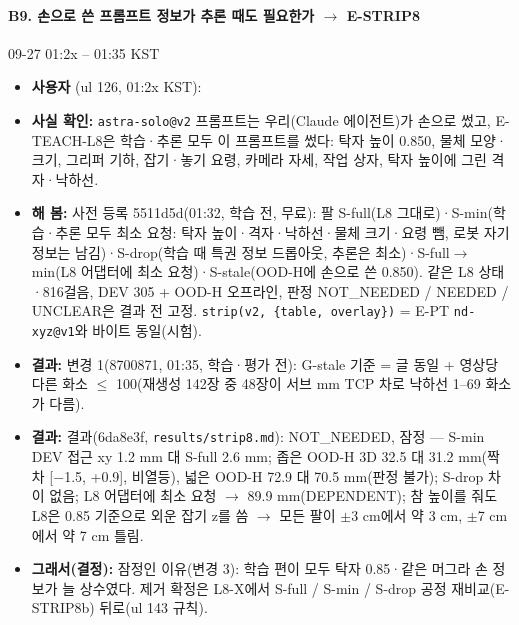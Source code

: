 \paragraph{B9. 손으로 쓴 프롬프트 정보가 추론 때도 필요한가 $\rightarrow$ E-STRIP8}
{\small 09-27 01:2x -- 01:35 KST}
\begin{itemize}
  \item \textbf{사용자} (ul 126, 01:2x KST): 
  \item \textbf{사실 확인:} \texttt{astra-\allowbreak{}solo@v2} 프롬프트는 우리(Claude 에이전트)가 손으로 썼고, E-TEACH-L8은 학습·추론 모두 이 프롬프트를 썼다: 탁자 높이 0.850, 물체 모양·크기, 그리퍼 기하, 잡기·놓기 요령, 카메라 자세, 작업 상자, 탁자 높이에 그린 격자·낙하선.
  \item \textbf{해 봄:} 사전 등록 5511d5d(01:32, 학습 전, 무료): 팔 S-full(L8 그대로)·S-min(학습·추론 모두 최소 요청: 탁자 높이·격자·낙하선·물체 크기·요령 뺌, 로봇 자기 정보는 남김)·S-drop(학습 때 특권 정보 드롭아웃, 추론은 최소)·S-full$\rightarrow$min(L8 어댑터에 최소 요청)·S-stale(OOD-H에 손으로 쓴 0.850). 같은 L8 상태·816걸음, DEV 305 + OOD-H 오프라인, 판정 NOT\_NEEDED / NEEDED / UNCLEAR은 결과 전 고정. \texttt{strip(v2, \{table, overlay\})} = E-PT \texttt{nd-\allowbreak{}xyz@v1}와 바이트 동일(시험).
  \item \textbf{결과:} 변경 1(8700871, 01:35, 학습·평가 전): G-stale 기준 = 글 동일 + 영상당 다른 화소 $\leq$ 100(재생성 142장 중 48장이 서브 mm TCP 차로 낙하선 1--69 화소가 다름).
  \item \textbf{결과:} 결과(6da8e3f, \texttt{results/\allowbreak{}strip8.\allowbreak{}md}): NOT\_NEEDED, 잠정 --- S-min DEV 접근 xy 1.2 mm 대 S-full 2.6 mm; 좁은 OOD-H 3D 32.5 대 31.2 mm(짝 차 [$-$1.5, +0.9], 비열등), 넓은 OOD-H 72.9 대 70.5 mm(판정 불가); S-drop 차이 없음; L8 어댑터에 최소 요청 $\rightarrow$ 89.9 mm(DEPENDENT); 참 높이를 줘도 L8은 0.85 기준으로 외운 잡기 z를 씀 $\rightarrow$ 모든 팔이 $\pm$3 cm에서 약 3 cm, $\pm$7 cm에서 약 7 cm 틀림.
  \item \textbf{그래서(결정):} 잠정인 이유(변경 3): 학습 편이 모두 탁자 0.85·같은 머그라 손 정보가 늘 상수였다. 제거 확정은 L8-X에서 S-full / S-min / S-drop 공정 재비교(E-STRIP8b) 뒤로(ul 143 규칙).
\end{itemize}

